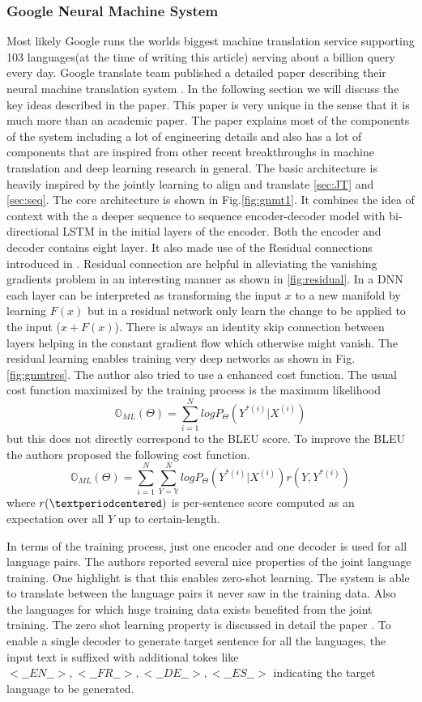 \documentclass[conference]{IEEEtran}
\begin{document}
\subsubsection{Google Neural Machine System}
Most likely Google runs the worlds biggest  \cite{WinNT} machine translation service supporting 103 languages(at the time of writing this article) serving about a 
billion query every day. Google translate team published a detailed paper describing their neural machine translation system \cite{wu2016google}. In the following section we will discuss the key ideas described in the paper. This paper is very unique in the sense that it is much more than an academic paper. The paper explains most of the components of the system including a lot of engineering details and also has a lot of components that are inspired from other recent breakthroughs in machine translation and deep learning research in general. The basic architecture is heavily inspired by the jointly learning to align and translate \ref{sec:JT}  and \ref{sec:seq}. The core architecture is shown in Fig.\ref{fig:gnmt1}. It combines the idea of context with the a deeper sequence to sequence encoder-decoder model with bi-directional LSTM in the initial layers of the encoder. Both the encoder and decoder contains eight layer. It also made use of the Residual connections introduced in \cite{he2016deep}. Residual connection are helpful in alleviating the vanishing gradients problem in an interesting manner as shown in \ref{fig:residual}. In a DNN each layer can be interpreted as transforming the input $x$ to a new manifold by learning $F(x)$ but in a residual network only learn the change to be applied to the input ($x + F(x)$). There is always an identity skip connection between layers helping in the constant gradient flow which otherwise might vanish. The residual learning enables training very deep networks as shown in Fig.\ref{fig:gnmtres}.
The author also tried to use a enhanced cost function. The usual cost function maximized by the training process is the maximum likelihood $$\mathbb{O}_{ML}(\Theta) = \sum_{i=1}^N log P_\Theta(Y^{*(i)} | X^{(i)}) $$ but this does not directly correspond to the BLEU score. To improve the BLEU the authors proposed the following cost function. $$ \mathbb{O}_{ML}(\Theta) = \sum_{i=1}^N \sum_{Y=\mathbb{Y}}^N log P_\Theta(Y^{*(i)} | X^{(i)}) r(Y, Y^{*(i)} ) $$
 where $r(\textperiodcentered)$ is per-sentence score computed as an expectation over all $Y$ up to certain-length.
 
 In terms of the training process, just one encoder and one decoder is used for all language pairs. The authors reported several nice properties of the joint language training. One highlight is that this enables zero-shot learning. The system is able to translate between the language pairs it never saw in the training data. Also the languages for which huge training data exists benefited from the joint training. The zero shot learning property is discussed in detail the paper \cite{johnson2016google}. To enable a single decoder to generate target sentence for all the languages, the input text is suffixed with additional tokes like  $<\_\_EN\_\_>, <\_\_FR\_\_>, <\_\_DE\_\_>, <\_\_ES\_\_>$ indicating the target language to be generated.
\end{document}
